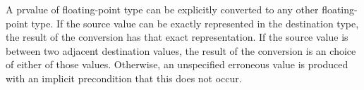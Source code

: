 \pnum
A prvalue of floating-point type can be explicitly converted to
any other floating-point type.
If the source value can be exactly represented in the destination type,
the result of the conversion has that exact representation.
If the source value is between two adjacent destination values,
the result of the conversion is
an  choice of
either of those values.
Otherwise, an unspecified erroneous value is produced
with an implicit precondition that this does not occur.
%
%
%
%
%

